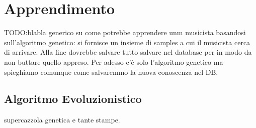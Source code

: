 \section{Apprendimento}
TODO:blabla generico su come potrebbe apprendere unm musicista basandosi sull'algoritmo genetico:
si fornisce un insieme di samples a cui il musicista cerca di arrivare. 
Alla fine dovrebbe salvare tutto salvare nel database per in modo da non buttare quello appreso.
Per adesso c'è solo l'algoritmo genetico ma spieghiamo comunque come salvaremmo la nuova conoscenza nel DB.  
\subsection{Algoritmo Evoluzionistico}
supercazzola genetica e tante stampe.
